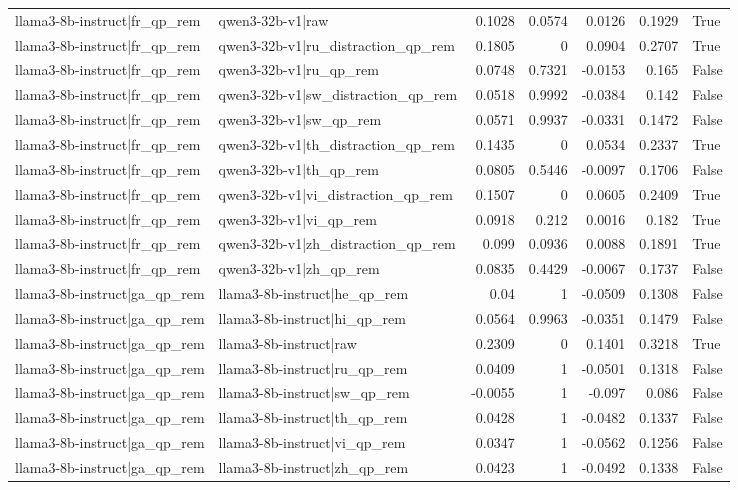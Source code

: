 \begin{table}
\begin{tabular}{l l r r r r l}
llama3-8b-instruct|fr_qp_rem & qwen3-32b-v1|raw & 0.1028 & 0.0574 & 0.0126 & 0.1929 & True \\
llama3-8b-instruct|fr_qp_rem & qwen3-32b-v1|ru_distraction_qp_rem & 0.1805 & 0 & 0.0904 & 0.2707 & True \\
llama3-8b-instruct|fr_qp_rem & qwen3-32b-v1|ru_qp_rem & 0.0748 & 0.7321 & -0.0153 & 0.165 & False \\
llama3-8b-instruct|fr_qp_rem & qwen3-32b-v1|sw_distraction_qp_rem & 0.0518 & 0.9992 & -0.0384 & 0.142 & False \\
llama3-8b-instruct|fr_qp_rem & qwen3-32b-v1|sw_qp_rem & 0.0571 & 0.9937 & -0.0331 & 0.1472 & False \\
llama3-8b-instruct|fr_qp_rem & qwen3-32b-v1|th_distraction_qp_rem & 0.1435 & 0 & 0.0534 & 0.2337 & True \\
llama3-8b-instruct|fr_qp_rem & qwen3-32b-v1|th_qp_rem & 0.0805 & 0.5446 & -0.0097 & 0.1706 & False \\
llama3-8b-instruct|fr_qp_rem & qwen3-32b-v1|vi_distraction_qp_rem & 0.1507 & 0 & 0.0605 & 0.2409 & True \\
llama3-8b-instruct|fr_qp_rem & qwen3-32b-v1|vi_qp_rem & 0.0918 & 0.212 & 0.0016 & 0.182 & True \\
llama3-8b-instruct|fr_qp_rem & qwen3-32b-v1|zh_distraction_qp_rem & 0.099 & 0.0936 & 0.0088 & 0.1891 & True \\
llama3-8b-instruct|fr_qp_rem & qwen3-32b-v1|zh_qp_rem & 0.0835 & 0.4429 & -0.0067 & 0.1737 & False \\
llama3-8b-instruct|ga_qp_rem & llama3-8b-instruct|he_qp_rem & 0.04 & 1 & -0.0509 & 0.1308 & False \\
llama3-8b-instruct|ga_qp_rem & llama3-8b-instruct|hi_qp_rem & 0.0564 & 0.9963 & -0.0351 & 0.1479 & False \\
llama3-8b-instruct|ga_qp_rem & llama3-8b-instruct|raw & 0.2309 & 0 & 0.1401 & 0.3218 & True \\
llama3-8b-instruct|ga_qp_rem & llama3-8b-instruct|ru_qp_rem & 0.0409 & 1 & -0.0501 & 0.1318 & False \\
llama3-8b-instruct|ga_qp_rem & llama3-8b-instruct|sw_qp_rem & -0.0055 & 1 & -0.097 & 0.086 & False \\
llama3-8b-instruct|ga_qp_rem & llama3-8b-instruct|th_qp_rem & 0.0428 & 1 & -0.0482 & 0.1337 & False \\
llama3-8b-instruct|ga_qp_rem & llama3-8b-instruct|vi_qp_rem & 0.0347 & 1 & -0.0562 & 0.1256 & False \\
llama3-8b-instruct|ga_qp_rem & llama3-8b-instruct|zh_qp_rem & 0.0423 & 1 & -0.0492 & 0.1338 & False \\

\end{tabular}
\end{table}

